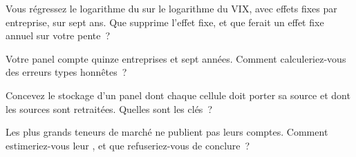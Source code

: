 \begin{interviewq}\label{iq:in:revenue-and-profit-across-the-industry:3}
Vous régressez le logarithme du  sur le logarithme du VIX, avec effets fixes par entreprise, sur sept ans. Que supprime l'effet fixe,
et que ferait un effet fixe annuel sur votre pente~?
\end{interviewq}

\begin{interviewq}\label{iq:in:revenue-and-profit-across-the-industry:4}
Votre panel compte quinze entreprises et sept années. Comment calculeriez-vous des erreurs types honnêtes~?
\end{interviewq}

\begin{interviewq}\label{iq:in:revenue-and-profit-across-the-industry:5}
Concevez le stockage d'un panel dont chaque cellule doit porter sa source et dont les sources sont retraitées. Quelles sont les clés~?
\end{interviewq}

\begin{interviewq}\label{iq:in:revenue-and-profit-across-the-industry:6}
Les plus grands teneurs de marché ne publient pas leurs comptes. Comment estimeriez-vous leur , et que refuseriez-vous
de conclure~?
\end{interviewq}
